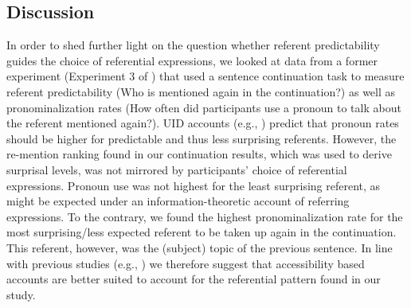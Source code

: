 \documentclass[output=paper,colorlinks,citecolor=brown]{langscibook}
\begin{document}
\subsection{Discussion}
In order to shed further light on the question whether referent predictability guides the choice of referential expressions, we looked at data from a former experiment (Experiment 3 of \citealt{Bader::Portele-19-The-interpretation-of}) that used a sentence continuation task to measure referent predictability (Who is mentioned again in the continuation?) as well as pronominalization rates (How often did participants use a pronoun to talk about the referent mentioned again?). UID accounts (e.g., \citealt{Fenk-Oczlon-89, Levy::Jaeger-06, Tily::Piantadosi-09}) predict that pronoun rates should be higher for predictable and thus less surprising referents. However, the re-mention ranking found in our continuation results, which was used to derive surprisal levels, was not mirrored by participants' choice of referential expressions. Pronoun use was not highest for the least surprising referent, as might be expected under an information-theoretic account of referring expressions. To the contrary, we found the highest pronominalization rate for the most surprising\slash less expected referent to be taken up again in the continuation. This referent, however, was the (subject) topic of the previous sentence. In line with previous studies (e.g., \citealt{Fukumura::van_Gompel-10, Rohde::Kehler-14}) we therefore suggest that accessibility based accounts are better suited to account for the referential pattern found in our study.
\end{document}
